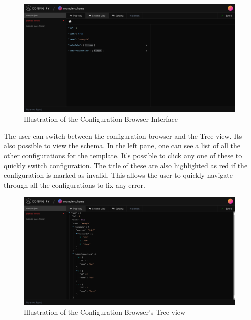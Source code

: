 \begin{figure}[!ht]
   \begin{minipage}{1\textwidth}
     \centering
     \includegraphics[width=.95\textwidth]{Figures/browser/index.pdf}
     \caption[Configuration Browser Interface]{Illustration of the Configuration Browser Interface}
     \label{browsing:browser}
   \end{minipage}\hfill
\end{figure}

\noindent
The user can switch between the configuration browser and the Tree view. Its also possible to view the schema. In the left pane, one can see a list of all the other configurations for the template. It's possible to click any one of these to quickly switch configuration. The title of these are also highlighted as red if the configuration is marked as invalid. This allows the user to quickly navigate through all the configurations to fix any error.
\begin{figure}[!ht]
   \begin{minipage}{1\textwidth}
     \centering
     \includegraphics[width=.95\textwidth]{Figures/browser/index-treeView.pdf}
     \caption[Configuration Browser Interface, Tree view]{Illustration of the Configuration Browser's Tree view}
     \label{browsing-treeView:browser}
   \end{minipage}\hfill
\end{figure}

